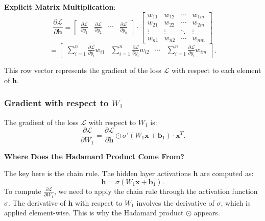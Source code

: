 \begin{notechapter}
\textbf{Explicit Matrix Multiplication}:
\[
\frac{\partial \mathcal{L}}{\partial \mathbf{h}} = \begin{bmatrix} 
\frac{\partial \mathcal{L}}{\partial y_1} & \frac{\partial \mathcal{L}}{\partial y_2} 
& \cdots & \frac{\partial \mathcal{L}}{\partial y_n} 
\end{bmatrix} \cdot \begin{bmatrix}
w_{11} & w_{12} & \cdots & w_{1m} \\
w_{21} & w_{22} & \cdots & w_{2m} \\
\vdots & \vdots & \ddots & \vdots \\
w_{n1} & w_{n2} & \cdots & w_{nm}
\end{bmatrix}
\]
\[
= \begin{bmatrix}
\sum_{i=1}^n \frac{\partial \mathcal{L}}{\partial y_i} w_{i1} & 
\sum_{i=1}^n \frac{\partial \mathcal{L}}{\partial y_i} w_{i2} & 
\cdots & 
\sum_{i=1}^n \frac{\partial \mathcal{L}}{\partial y_i} w_{im}
\end{bmatrix}.
\]

This row vector represents the gradient of the loss \( \mathcal{L} \) with respect to each element of \( \mathbf{h} \).

\subsubsection{Gradient with respect to \( W_1 \)}
The gradient of the loss \( \mathcal{L} \) with respect to \( W_1 \) is:
\[
\frac{\partial \mathcal{L}}{\partial W_1} = \frac{\partial \mathcal{L}}{\partial \mathbf{h}} \odot \sigma'(W_1 \mathbf{x} + \mathbf{b}_1) \cdot \mathbf{x}^T.
\]

\textbf{Where Does the Hadamard Product Come From?}

The key here is the chain rule. The hidden layer activations \( \mathbf{h} \) are computed as:
\[
\mathbf{h} = \sigma(W_1 \mathbf{x} + \mathbf{b}_1).
\]
To compute \( \frac{\partial \mathcal{L}}{\partial W_1} \), we need to apply the chain rule through the activation function \( \sigma \). The derivative of \( \mathbf{h} \) with respect to \( W_1 \) involves the derivative of \( \sigma \), which is applied element-wise. This is why the Hadamard product \( \odot \) appears.


\end{notechapter}

